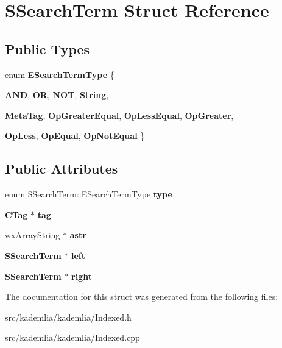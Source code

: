 \section{SSearchTerm Struct Reference}
\label{structSSearchTerm}
\subsection*{Public Types}
\begin{DoxyCompactItemize}
\item 
enum {\bfseries ESearchTermType} \{ \par
{\bfseries AND}, 
{\bfseries OR}, 
{\bfseries NOT}, 
{\bfseries String}, 
\par
{\bfseries MetaTag}, 
{\bfseries OpGreaterEqual}, 
{\bfseries OpLessEqual}, 
{\bfseries OpGreater}, 
\par
{\bfseries OpLess}, 
{\bfseries OpEqual}, 
{\bfseries OpNotEqual}
 \}
\end{DoxyCompactItemize}
\subsection*{Public Attributes}
\begin{DoxyCompactItemize}
\item 
enum SSearchTerm::ESearchTermType {\bfseries type}\label{structSSearchTerm_a78a0046846c084b94081d5cb28b48081}

\item 
{\bf CTag} $\ast$ {\bfseries tag}\label{structSSearchTerm_a61f0609a6a3234322cc58e4bfd2259e3}

\item 
wxArrayString $\ast$ {\bfseries astr}\label{structSSearchTerm_a04936f04ac7f5dec185c701bcd59cba5}

\item 
{\bf SSearchTerm} $\ast$ {\bfseries left}\label{structSSearchTerm_a375a13733ac0d7fd143e9a92bf3a927e}

\item 
{\bf SSearchTerm} $\ast$ {\bfseries right}\label{structSSearchTerm_a84262b72758ae58c60439726297dd68a}

\end{DoxyCompactItemize}


The documentation for this struct was generated from the following files:\begin{DoxyCompactItemize}
\item 
src/kademlia/kademlia/Indexed.h\item 
src/kademlia/kademlia/Indexed.cpp\end{DoxyCompactItemize}
